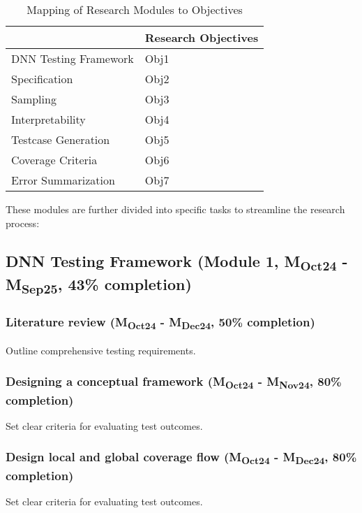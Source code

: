 \begin{table}[ht]
  \centering
  \renewcommand{\arraystretch}{1.5} %
  \begin{tabular}{|l|l|}
    \hline
    \rowcolor[HTML]{000000} 
    \multicolumn{1}{|c|}{\cellcolor[HTML]{000000}{\color[HTML]{FFFFFF} \textbf{Research Modules}}} & {\color[HTML]{FFFFFF} \textbf{Research Objectives}} \\ \hline
    {\color[HTML]{404040} DNN Testing Framework} & Obj1 \\ \hline
    {\color[HTML]{404040} Specification} & Obj2 \\ \hline
    {\color[HTML]{404040} Sampling} & Obj3 \\ \hline
    {\color[HTML]{404040} Interpretability} & Obj4 \\ \hline
    {\color[HTML]{404040} Testcase Generation} & Obj5 \\ \hline
    {\color[HTML]{404040} Coverage Criteria} & Obj6 \\ \hline
    Error Summarization & Obj7 \\ \hline
  \end{tabular}
  \caption{Mapping of Research Modules to Objectives}
  \label{table:modules}
\end{table}




These modules are further divided into specific tasks to streamline the research process:

\subsection{DNN Testing Framework (Module 1, M\textsubscript{Oct24} - M\textsubscript{Sep25}, 43\% completion)}

\subsubsection{Literature review (M\textsubscript{Oct24} - M\textsubscript{Dec24}, 50\% completion)}
Outline comprehensive testing requirements.

\subsubsection{Designing a conceptual framework (M\textsubscript{Oct24} - M\textsubscript{Nov24}, 80\% completion)}
Set clear criteria for evaluating test outcomes.

\subsubsection{Design local and global coverage flow (M\textsubscript{Oct24} - M\textsubscript{Dec24}, 80\% completion)}
Set clear criteria for evaluating test outcomes.



